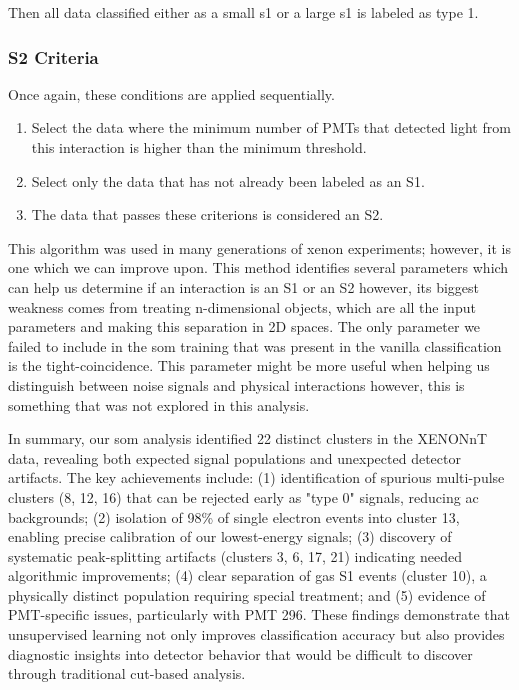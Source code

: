 Then all data classified either as a small s1 or a large s1 is labeled as type 1.

\subsubsection*{S2 Criteria}

Once again, these conditions are applied sequentially.

\begin{enumerate}
    \item Select the data where the minimum number of PMTs that detected light from this interaction is higher than the minimum threshold.
    \item Select only the data that has not already been labeled as an S1.
    \item The data that passes these criterions is considered an S2.
\end{enumerate}

This algorithm was used in many generations of xenon experiments; however, it is one which we can improve upon. This method identifies several parameters which can help us determine if an interaction is an S1 or an S2 however, its biggest weakness comes from treating n-dimensional objects, which are all the input parameters and making this separation in 2D spaces. The only parameter we failed to include in the \acrshort{som} training that was present in the vanilla classification is the tight-coincidence. This parameter might be more useful when helping us distinguish between noise signals and physical interactions however, this is something that was not explored in this analysis.

In summary, our \acrshort{som} analysis identified 22 distinct clusters in the XENONnT data, revealing both expected signal populations and unexpected detector artifacts. The key achievements include: (1) identification of spurious multi-pulse clusters (8, 12, 16) that can be rejected early as "type 0" signals, reducing \acrshort{ac} backgrounds; (2) isolation of 98\% of single electron events into cluster 13, enabling precise calibration of our lowest-energy signals; (3) discovery of systematic peak-splitting artifacts (clusters 3, 6, 17, 21) indicating needed algorithmic improvements; (4) clear separation of gas S1 events (cluster 10), a physically distinct population requiring special treatment; and (5) evidence of PMT-specific issues, particularly with PMT 296. These findings demonstrate that unsupervised learning not only improves classification accuracy but also provides diagnostic insights into detector behavior that would be difficult to discover through traditional cut-based analysis.

